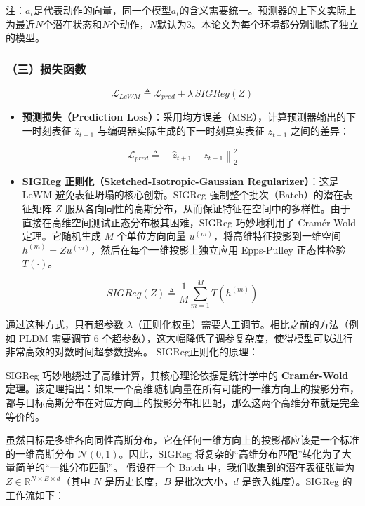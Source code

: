注：\(a_t\)是代表动作的向量，同一个模型\(a_t\)的含义需要统一。预测器的上下文实际上为最近\(N\)个潜在状态和\(N\)个动作，\(N\)默认为3。本论文为每个环境都分别训练了独立的模型。

\hypertarget{ux4e09ux635fux5931ux51fdux6570-1}{%
\subsubsection{（三）损失函数}\label{ux4e09ux635fux5931ux51fdux6570-1}}

\[
\mathcal{L}_{LeWM} \triangleq \mathcal{L}_{pred} + \lambda\,SIGReg(Z)
\]

\begin{itemize}
\tightlist
\item
{}
  \textbf{预测损失（Prediction Loss）}：采用均方误差（MSE），计算预测器输出的下一时刻表征 \(\hat{z}_{t+1}\) 与编码器实际生成的下一时刻真实表征 \(z_{t+1}\) 之间的差异：
\end{itemize}

\[
\mathcal{L}_{pred} \triangleq \left\|\hat{z}_{t+1}-z_{t+1}\right\|_2^2
\]

\begin{itemize}
\tightlist
\item
  \textbf{SIGReg 正则化（Sketched-Isotropic-Gaussian Regularizer）}：这是 LeWM 避免表征坍塌的核心创新。SIGReg 强制整个批次（Batch）的潜在表征矩阵 \(Z\) 服从各向同性的高斯分布，从而保证特征在空间中的多样性。由于直接在高维空间测试正态分布极其困难，SIGReg 巧妙地利用了 Cramér-Wold 定理。它随机生成 \(M\) 个单位方向向量 \(u^{(m)}\)，将高维特征投影到一维空间 \(h^{(m)} = Zu^{(m)}\)，然后在每个一维投影上独立应用 Epps-Pulley 正态性检验 \(T(\cdot)\)。
\end{itemize}

\[
SIGReg(Z) \triangleq \frac{1}{M}\sum_{m=1}^{M} T(h^{(m)})
\]

通过这种方式，只有超参数 \(\lambda\)（正则化权重）需要人工调节。相比之前的方法（例如 PLDM 需要调节 \(6\) 个超参数），这大幅降低了调参复杂度，使得模型可以进行非常高效的对数时间超参数搜索。
SIGReg正则化的原理：

SIGReg 巧妙地绕过了高维计算，其核心理论依据是统计学中的 \textbf{Cramér-Wold 定理}。该定理指出：如果一个高维随机向量在所有可能的一维方向上的投影分布，都与目标高斯分布在对应方向上的投影分布相匹配，那么这两个高维分布就是完全等价的。

虽然目标是多维各向同性高斯分布，它在任何一维方向上的投影都应该是一个标准的一维高斯分布 \(\mathcal{N}(0,1)\)。因此，SIGReg 将复杂的``高维分布匹配''转化为了大量简单的``一维分布匹配''。
假设在一个 Batch 中，我们收集到的潜在表征张量为 \(Z \in \mathbb{R}^{N\times B\times d}\)（其中 \(N\) 是历史长度，\(B\) 是批次大小，\(d\) 是嵌入维度）。SIGReg 的工作流如下：

